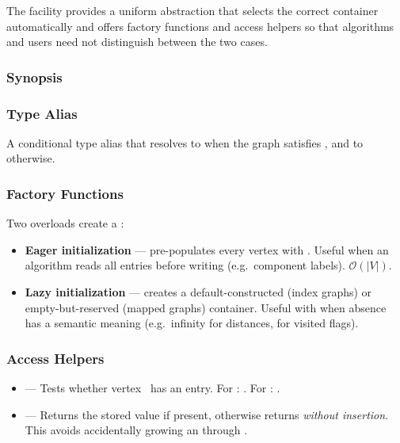 The  facility provides a uniform abstraction that selects the
correct container automatically and offers factory functions and access helpers so that
algorithms and users need not distinguish between the two cases.

\subsubsection{Synopsis}
{\small
      
}

\subsubsection{ Type Alias}
A conditional type alias that resolves to  when the graph 
satisfies , and to
 otherwise.

\subsubsection{ Factory Functions}
Two overloads create a :
\begin{itemize}
      \item \textbf{Eager initialization} ---
             pre-populates every vertex with
            .  Useful when an algorithm reads all entries before writing
            (e.g.\ component labels).  $\mathcal{O}(|V|)$.
      \item \textbf{Lazy initialization} ---
             creates a default-constructed
            (index graphs) or empty-but-reserved (mapped graphs) container.
            Useful with  when absence has a semantic meaning
            (e.g.\ infinity for distances,  for visited flags).
\end{itemize}

\subsubsection{Access Helpers}
\begin{itemize}
      \item {} ---
            Tests whether vertex~ has an entry.
            For : .
            For : .
      \item {} ---
            Returns the stored value if present, otherwise returns 
            \emph{without insertion}.  This avoids accidentally growing an
             through .
\end{itemize}

